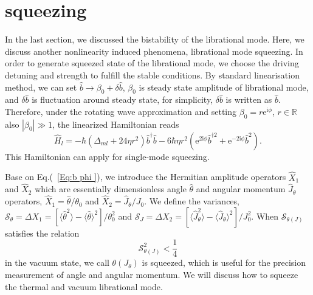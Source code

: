 \documentclass[pra,aps,superscriptaddress,showpacs,preprint]{revtex4}%
\begin{document}
\section{squeezing}
\label{SectIV}
In the last section, we discussed the bistability of the librational mode. Here, we discuss another nonlinearity induced phenomena, librational mode squeezing.
In order to generate squeezed state of the librational mode, we choose the driving detuning and strength to fulfill the stable conditions.
By standard linearisation method, we can set $\hat{b}\rightarrow\beta_{0}+\delta\hat{b}$, $\beta_{0}$ is steady state amplitude of librational mode, and $\delta\hat{b}$ is fluctuation around steady state, for simplicity, $\delta\hat{b}$ is written as $\hat{b}$.
Therefore, under the rotating wave approximation and setting $\beta_{0}=r\mathrm{e}^{\mathrm{i}\phi}$, $r\in\mathbb{R}$  also $|\beta_{0}|\gg 1$, the linearized Hamiltonian reads
\begin{equation} \label{Eq:linearisated Hamiltonian}
\hat{H}_{l}=-\hbar(\Delta_{ml}+24\eta r^{2})\hat{b}^{\dag}\hat{b}-6\hbar\eta r^{2}(\mathrm{e}^{2\mathrm{i}\phi}\hat{b}^{\dag 2}+\mathrm{e}^{-2\mathrm{i}\phi}\hat{b}^{2}).
\end{equation}
This Hamiltonian can apply for single-mode squeezing.


Base on Eq.(~\ref{Eq:b phi }), we introduce the Hermitian amplitude operators $\hat{X}_{1}$ and $\hat{X}_{2}$ which are essentially dimensionless angle $\hat{\theta}$ and angular momentum $\hat{J}_{\theta}$ operators,
$\hat{X}_{1}=\hat{\theta}/\theta_{0}$ and
$\hat{X}_{2}=\hat{J}_{\theta}/J_{0}$. We define the variances, $\mathcal{S}_{\theta}=\Delta X_{1}=[\langle\hat{\theta}^{2}\rangle-\langle\hat{\theta}\rangle^{2}]/\theta_{0}^{2}$ and $\mathcal{S}_{J}=\Delta X_{2}=[\langle\hat{J}_{\theta}^{2}\rangle-\langle\hat{J}_{\theta}\rangle^{2}]/J_{0}^{2}$. When $\mathcal{S}_{\theta(J)}$ satisfies the relation
\begin{equation}
\mathcal{S}_{\theta(J)}^{2}<\frac{1}{4}
\label{Eq:D Xi}
\end{equation}
in the vacuum state, we call $\theta(J_{\theta})$ is squeezed, which is useful for the precision measurement of angle and angular momentum. We will discuss how to squeeze the thermal and vacuum librational mode.
\end{document}

